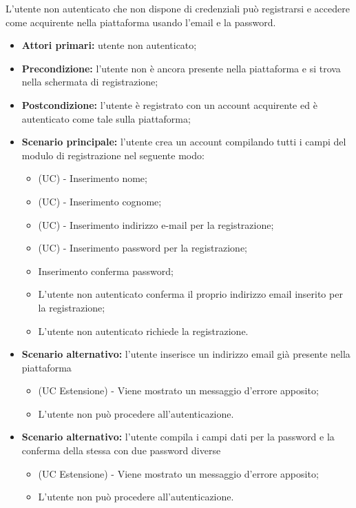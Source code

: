 L'utente non autenticato che non dispone di credenziali può registrarsi e accedere come acquirente nella piattaforma usando l'email e la password.
\begin{itemize}
    \item \textbf{Attori primari:} utente non autenticato;
    \item \textbf{Precondizione:} l'utente non è ancora presente nella piattaforma e si trova nella schermata di registrazione;
    \item \textbf{Postcondizione:} l'utente è registrato con un account acquirente ed è autenticato come tale sulla piattaforma;
    \item \textbf{Scenario principale:} l'utente crea un account compilando tutti i campi del modulo di registrazione nel seguente modo:
    \begin{itemize}
    	\item (UC) - Inserimento nome;
    	\item (UC) - Inserimento cognome;
        \item (UC) - Inserimento indirizzo e-mail per la registrazione;
        \item (UC) - Inserimento password per la registrazione;
        \item Inserimento conferma password;
        \item L'utente non autenticato conferma il proprio indirizzo email inserito per la registrazione;
        \item L'utente non autenticato richiede la registrazione.
    \end{itemize}
	\item \textbf{Scenario alternativo:} l'utente inserisce un indirizzo email già presente nella piattaforma
	\begin{itemize}
		\item (UC Estensione) - Viene mostrato un messaggio d'errore apposito;
		\item L'utente non può procedere all'autenticazione.
	\end{itemize}
	\item \textbf{Scenario alternativo:} l'utente compila i campi dati per la password e la conferma della stessa con due password diverse
	\begin{itemize}
		\item (UC Estensione) - Viene mostrato un messaggio d'errore apposito;
		\item L'utente non può procedere all'autenticazione.
	\end{itemize}

\end{itemize}
